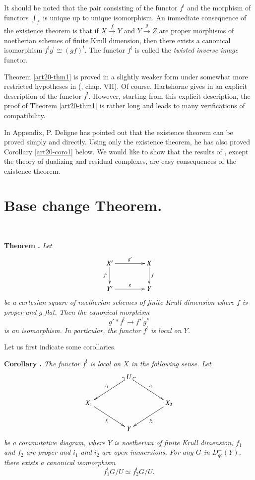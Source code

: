 It should be noted that the pair consisting of the functor $f^{!}$ and the morphism of functors $\int_{f}$ is unique up to unique isomorphism. An immediate consequence of the existence theorem is that if $X\xrightarrow{f}Y$ and $Y\xrightarrow{g}Z$ are proper morphisms of noetherian schemes of finite Krull dimension, then there exists a canonical isomorphism $f^{!}g^{!}\cong (gf)^{!}$. The functor $f^{!}$ is called the {\em twisted inverse image} functor.

Theorem \ref{art20-thm1} is proved in a slightly weaker form under somewhat more restricted hypotheses in (\cite{art20-key1}, chap. VII). Of course, Hartshorne gives in \cite{art20-key1} an explicit description of the functor $f^{!}$. However, starting from this explicit description, the proof of Theorem \ref{art20-thm1} is rather long and leads to many verifications of compatibility.

In \cite{art20-key1} Appendix, P. Deligne has pointed out that the existence theorem can be proved simply and directly. Using only the existence theorem, he has also proved Corollary \ref{art20-coro1} below. We would like to show that the results of \cite{art20-key1}, except the theory of dualizing and residual complexes, are easy consequences of the existence theorem.

\eject

\section{Base change Theorem.}\label{art20-sec2}

~
\smallskip

\noindent
{\bf Theorem .\label{ART20-THM2}}
{\em Let}
\[
\xymatrix@C=1.5cm{
X'\ar[d]_-{f'}\ar[r]^-{g'} & X\ar[d]^-{f}\\
Y'\ar[r]^-{g} & Y
}
\]
{\em be a cartesian square of noetherian schemes of finite Krull dimension where $f$ is proper and $g$ flat. Then the canonical morphism}
\begin{equation}
g'\ast f^{!}\to {f'}^{!}g^{*}\label{art20-2.1}
\end{equation}\pageoriginale
{\em is an isomorphism. In particular, the functor $f^{!}$ is local on $Y$.}
\smallskip

Let us first indicate some corollaries.

\medskip
\noindent
{\bf Corollary .\label{art20-coro1}}
{\em The functor $f^{!}$ is local on $X$ in the following sense. Let}
\[
\xymatrix@C=1.5cm{
 & U\ar@{_(->}[dl]_-{i_{1}}\ar@{^(->}[dr]^-{i_{2}} & \\
X_{1}\ar[dr]_-{f_{1}} & & X_{2}\ar[dl]^-{f_{2}}\\
 & Y & 
}
\]
{\em be a commutative diagram, where $Y$ is noetherian of finite Krull dimension, $f_{1}$ and $f_{2}$ are proper and $i_{1}$ and $i_{2}$ are open immersions. For any $G$ in $D^{+}_{qc}(Y)$, there exists a canonical isomorphism}
$$
f^{!}_{1}G/U\simeq f^{!}_{2}G/U.
$$

